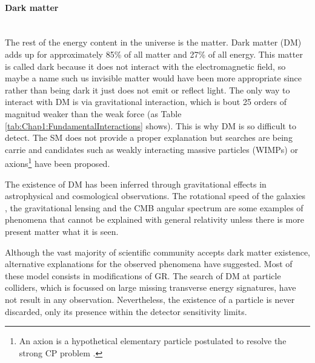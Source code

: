 \paragraph{Dark matter}\mbox{}\\
The rest of the energy content in the universe is the matter. 
Dark matter (DM) adds up for approximately 85\% of all matter and 27\% of all energy. 
This matter is called dark because it does not interact with the electromagnetic field, so maybe a name such us invisible matter would have been more appropriate
 since rather than being dark it just does not emit or reflect light.
The only way to interact with DM is via gravitational interaction, which is bout 25 orders of
magnitud weaker than the weak force (as Table \ref{tab:Chap1:FundamentalInteractions} shows). This is why DM is so difficult to detect. 
The SM does not provide a proper explanation but searches are being carrie and candidates such as 
weakly interacting massive particles (WIMPs) or axions\footnote{An axion is a hypothetical elementary particle postulated to resolve the strong CP problem \cite{Weinberg:1977ma} \cite{Wilczek:1977pj}.} have been proposed.

The existence of DM has been inferred through gravitational effects in astrophysical and cosmological observations. 
The rotational speed of the galaxies \cite{Rubin:1970zza}, the gravitational lensing \cite{Taylor:1998uk} and the CMB angular spectrum \cite{Planck:2015fie} are
some examples of phenomena that cannot be explained with general relativity unless there is more present matter what it is seen.

Although the vast majority of scientific community accepts dark matter existence, alternative explanations for the observed phenomena have suggested. 
Most of these model consists in modifications of GR.
The search of DM at particle colliders, which is focussed on large missing transverse energy signatures, have not result in any observation. Nevertheless,
the existence of a particle is never discarded, only its presence within the detector sensitivity limits.



